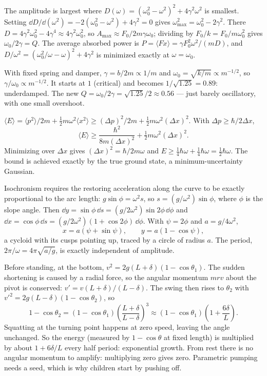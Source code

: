  The amplitude is largest where $D(\omega) = (\omega_0^2-\omega^2)^2 + 4\gamma^2\omega^2$ is smallest. Setting $\dd D/\dd(\omega^2) = -2(\omega_0^2-\omega^2) + 4\gamma^2 = 0$ gives $\omega_{\max}^2 = \omega_0^2-2\gamma^2$. There $D = 4\gamma^2\omega_0^2 - 4\gamma^4\approx4\gamma^2\omega_0^2$, so $A_{\max}\approx F_0/2m\gamma\omega_0$; dividing by $F_0/k = F_0/m\omega_0^2$ gives $\omega_0/2\gamma = Q$. The average absorbed power is $P = \langle F\dot x\rangle = \gamma F_0^2\omega^2/(mD)$, and $D/\omega^2 = (\omega_0^2/\omega - \omega)^2 + 4\gamma^2$ is minimized exactly at $\omega = \omega_0$.

 With fixed spring and damper, $\gamma = b/2m\propto1/m$ and $\omega_0 = \sqrt{k/m}\propto m^{-1/2}$, so $\gamma/\omega_0\propto m^{-1/2}$. It starts at $1$ (critical) and becomes $1/\sqrt{1.25} = 0.89$: underdamped. The new $Q = \omega_0/2\gamma = \sqrt{1.25}/2\approx0.56$ --- just barely oscillatory, with one small overshoot.

 $\langle E\rangle = \langle p^2\rangle/2m + \tfrac12m\omega^2\langle x^2\rangle\ge(\Delta p)^2/2m + \tfrac12m\omega^2(\Delta x)^2$. With $\Delta p\ge\hbar/2\Delta x$,
\[
  \langle E\rangle\ge\frac{\hbar^2}{8m(\Delta x)^2} + \tfrac12m\omega^2(\Delta x)^2 .
\]
Minimizing over $\Delta x$ gives $(\Delta x)^2 = \hbar/2m\omega$ and $E\ge\tfrac14\hbar\omega + \tfrac14\hbar\omega = \tfrac12\hbar\omega$. The bound is achieved exactly by the true ground state, a minimum-uncertainty Gaussian.

 Isochronism requires the restoring acceleration along the curve to be exactly proportional to the arc length: $g\sin\phi = \omega^2s$, so $s = (g/\omega^2)\sin\phi$, where $\phi$ is the slope angle. Then $\dd y = \sin\phi\,\dd s = (g/2\omega^2)\sin2\phi\,\dd\phi$ and $\dd x = \cos\phi\,\dd s = (g/2\omega^2)(1+\cos2\phi)\,\dd\phi$. With $\psi = 2\phi$ and $a = g/4\omega^2$,
\[
  x = a(\psi + \sin\psi),\qquad y = a(1 - \cos\psi),
\]
a cycloid with its cusps pointing up, traced by a circle of radius $a$. The period, $2\pi/\omega = 4\pi\sqrt{a/g}$, is exactly independent of amplitude.

 Before standing, at the bottom, $v^2 = 2g(L+\delta)(1-\cos\theta_1)$. The sudden shortening is caused by a radial force, so the angular momentum $mrv$ about the pivot is conserved: $v' = v(L+\delta)/(L-\delta)$. The swing then rises to $\theta_2$ with $v'^2 = 2g(L-\delta)(1-\cos\theta_2)$, so
\[
  1-\cos\theta_2 = (1-\cos\theta_1)\left(\frac{L+\delta}{L-\delta}\right)^3\approx(1-\cos\theta_1)\left(1 + \frac{6\delta}{L}\right).
\]
Squatting at the turning point happens at zero speed, leaving the angle unchanged. So the energy (measured by $1-\cos\theta$ at fixed length) is multiplied by about $1+6\delta/L$ every half period: exponential growth. From rest there is no angular momentum to amplify: multiplying zero gives zero. Parametric pumping needs a seed, which is why children start by pushing off.
